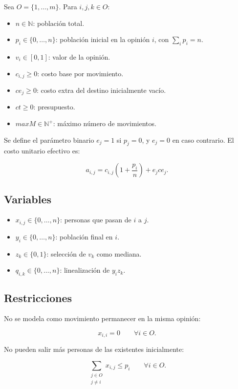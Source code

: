 \documentclass[11pt,letterpaper]{article}
\begin{document}
Sea \(O=\{1,\ldots,m\}\). Para \(i,j,k\in O\):

\begin{itemize}[nosep]
    \item \(n\in\mathbb{N}\): población total.
    \item \(p_i\in\{0,\ldots,n\}\): población inicial en la opinión \(i\),
    con \(\sum_i p_i=n\).
    \item \(v_i\in[0,1]\): valor de la opinión.
    \item \(c_{i,j}\ge0\): costo base por movimiento.
    \item \(ce_j\ge0\): costo extra del destino inicialmente vacío.
    \item \(ct\ge0\): presupuesto.
    \item \(maxM\in\mathbb{N}^{+}\): máximo número de movimientos.
\end{itemize}

Se define el parámetro binario \(e_j=1\) si \(p_j=0\), y \(e_j=0\) en caso
contrario. El costo unitario efectivo es:

\[
a_{i,j}=c_{i,j}\left(1+\frac{p_i}{n}\right)+e_jce_j.
\]

\subsection{Variables}

\begin{itemize}[nosep]
    \item \(x_{i,j}\in\{0,\ldots,n\}\): personas que pasan de \(i\) a \(j\).
    \item \(y_i\in\{0,\ldots,n\}\): población final en \(i\).
    \item \(z_k\in\{0,1\}\): selección de \(v_k\) como mediana.
    \item \(q_{i,k}\in\{0,\ldots,n\}\): linealización de \(y_i z_k\).
\end{itemize}

\subsection{Restricciones}

No se modela como movimiento permanecer en la misma opinión:

\[
x_{i,i}=0 \qquad \forall i\in O.
\]

No pueden salir más personas de las existentes inicialmente:

\[
\sum_{\substack{j\in O\\j\ne i}}x_{i,j}\le p_i
\qquad \forall i\in O.
\]
\end{document}
